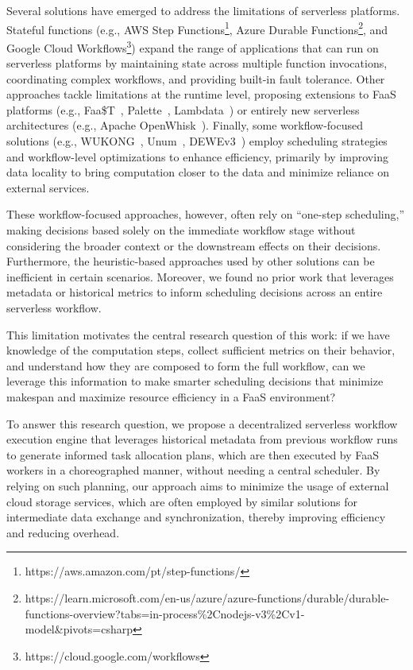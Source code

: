 \documentclass[conference]{IEEEtran}
\begin{document}
Several solutions have emerged to address the limitations of serverless platforms. Stateful functions (e.g., AWS Step Functions\footnote{\label{fn:aws-step-functions}https://aws.amazon.com/pt/step-functions/}, Azure Durable Functions\footnote{\label{fn:azure-durable-functions}https://learn.microsoft.com/en-us/azure/azure-functions/durable/durable-functions-overview?tabs=in-process\%2Cnodejs-v3\%2Cv1-model\&pivots=csharp}, and Google Cloud Workflows\footnote{\label{fn:google-cloud-workflows}https://cloud.google.com/workflows}) expand the range of applications that can run on serverless platforms by maintaining state across multiple function invocations, coordinating complex workflows, and providing built-in fault tolerance. Other approaches tackle limitations at the runtime level, proposing extensions to FaaS platforms (e.g., Faa\$T~\cite{faast_caching}, Palette~\cite{palette_load_balancing}, Lambdata~\cite{lambdata_intents}) or entirely new serverless architectures (e.g., Apache OpenWhisk~\cite{open_whisk}). Finally, some workflow-focused solutions (e.g., WUKONG~\cite{wukong_2}, Unum~\cite{unum_decentralized_orchestrator}, DEWEv3~\cite{dewe_v3}) employ scheduling strategies and workflow-level optimizations to enhance efficiency, primarily by improving data locality to bring computation closer to the data and minimize reliance on external services.

These workflow-focused approaches, however, often rely on “one-step scheduling,” making decisions based solely on the immediate workflow stage without considering the broader context or the downstream effects on their decisions. Furthermore, the heuristic-based approaches used by other solutions can be inefficient in certain scenarios. Moreover, we found no prior work that leverages metadata or historical metrics to inform scheduling decisions across an entire serverless workflow. 

This limitation motivates the central research question of this work: if we have knowledge of the computation steps, collect sufficient metrics on their behavior, and understand how they are composed to form the full workflow, can we leverage this information to make smarter scheduling decisions that minimize makespan and maximize resource efficiency in a FaaS environment?

To answer this research question, we propose a decentralized serverless workflow execution engine that leverages historical metadata from previous workflow runs to generate informed task allocation plans, which are then executed by FaaS workers in a choreographed manner, without needing a central scheduler. By relying on such planning, our approach aims to minimize the usage of external cloud storage services, which are often employed by similar solutions for intermediate data exchange and synchronization, thereby improving efficiency and reducing overhead.
\end{document}

